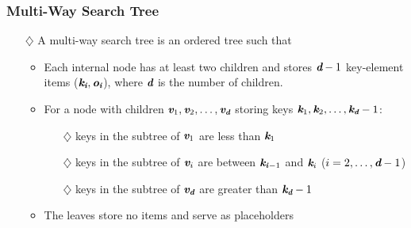 \documentclass[pdf,
serif,
compress,
xcolor=table,
dvipsnames,
spanish,
aspectratio=169]{beamer}
\begin{document}
\begin{frame}
    \frametitle{Multi-Way Search Tree}
    \begin{itemize} \color{purpura}
        \item[\(\diamondsuit\)] A multi-way search tree is an ordered tree such that
        \begin{itemize} \color{purpura}
            \item Each internal node has at least two children and stores \(\mathbf{\textit{\textbf{d}}} - 1\) key-element items (\(\mathbf{\textit{\textbf{k}}}_\mathbf{\textit{\textbf{i}}}, \mathbf{\textit{\textbf{o}}}_\mathbf{\textit{\textbf{i}}}\)), where \(\mathbf{\textit{\textbf{d}}}\) is the number of children.
    
            \item For a node with children \(\textit{\textbf{v}}_1, \textit{\textbf{v}}_2, \ldots, \textit{\textbf{v}}_\mathbf{\textit{\textbf{d}}}\) storing keys \(\textit{\textbf{k}}_1, \textit{\textbf{k}}_2, \ldots, \textit{\textbf{k}}_\mathbf{\textit{\textbf{d}}}-1\):
            \begin{itemize} \color{purpura}
                \item[\(\diamondsuit\)] keys in the subtree of \(\textit{\textbf{v}}_1\) are less than \(\textit{\textbf{k}}_1\)
                \item[\(\diamondsuit\)] keys in the subtree of \(\textit{\textbf{v}}_i\) are between \(\mathbf{\textit{\textbf{k}}}_{\textbf{\textit{i}}-1}\) and \(\textit{\textbf{k}}_i\) (\(i = 2, \ldots, \mathbf{\textit{\textbf{d}}} - 1\))
                \item[\(\diamondsuit\)] keys in the subtree of \(\textit{\textbf{v}}_\mathbf{\textit{\textbf{d}}}\) are greater than \(\textit{\textbf{k}}_\mathbf{\textit{\textbf{d}}}-1\)
            \end{itemize}
    
            \item The leaves store no items and serve as placeholders
        \end{itemize}
    \end{itemize}


\end{frame}
\end{document}
